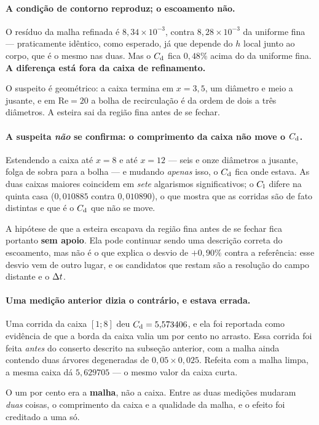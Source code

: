 \paragraph{A condição de contorno reproduz; o escoamento não.} O resíduo da
malha refinada é $8{,}34\times10^{-3}$, contra $8{,}28\times10^{-3}$ da uniforme
fina --- praticamente idêntico, como esperado, já que depende do $h$ local junto
ao corpo, que é o mesmo nas duas. Mas o $C_{\mathrm{d}}$ fica $0{,}48\%$ acima do da
uniforme fina. \textbf{A diferença está fora da caixa de refinamento.}

O suspeito é geométrico: a caixa termina em $x=3{,}5$, um diâmetro e meio a
jusante, e em $\mathrm{Re}=20$ a bolha de recirculação é da ordem de dois a três
diâmetros. A esteira sai da região fina antes de se fechar.

\paragraph{A suspeita \emph{não} se confirma: o comprimento da caixa não move o
$C_{\mathrm{d}}$.} Estendendo a caixa até $x=8$ e até $x=12$ --- seis e onze diâmetros a
jusante, folga de sobra para a bolha --- e mudando \emph{apenas} isso, o $C_{\mathrm{d}}$
fica onde estava. As duas caixas maiores coincidem em \emph{sete} algarismos
significativos; o $C_{\mathrm{l}}$ difere na quinta casa ($0{,}010885$ contra $0{,}010890$),
o que mostra que as corridas são de fato distintas e que é o $C_{\mathrm{d}}$ que não se
move.

A hipótese de que a esteira escapava da região fina antes de se fechar fica
portanto \textbf{sem apoio}. Ela pode continuar sendo uma descrição correta do
escoamento, mas não é o que explica o desvio de $+0{,}90\%$ contra a referência:
esse desvio vem de outro lugar, e os candidatos que restam são a resolução do
campo distante e o $\Delta t$.

\paragraph{Uma medição anterior dizia o contrário, e estava errada.} Uma corrida
da caixa $[1;8]$ deu $C_{\mathrm{d}} = 5{,}573406$, e ela foi reportada como evidência de
que a borda da caixa valia um por cento no arrasto. Essa corrida foi feita
\emph{antes} do conserto descrito na subseção anterior, com a malha ainda
contendo duas árvores degeneradas de $0{,}05 \times 0{,}025$. Refeita com a
malha limpa, a mesma caixa dá $5{,}629705$ --- o mesmo valor da caixa curta.

O um por cento era a \textbf{malha}, não a caixa. Entre as duas medições mudaram
\emph{duas} coisas, o comprimento da caixa e a qualidade da malha, e o efeito
foi creditado a uma só.

